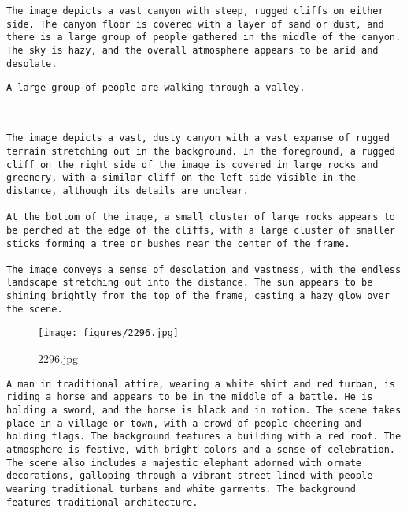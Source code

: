 \begin{lstlisting}[caption={Captions using Phi 4 for 998.jpg}]
The image depicts a vast canyon with steep, rugged cliffs on either side. The canyon floor is covered with a layer of sand or dust, and there is a large group of people gathered in the middle of the canyon. The sky is hazy, and the overall atmosphere appears to be arid and desolate.
\end{lstlisting}


\begin{lstlisting}[caption={Captions using Phi 4 with SAM 2 for 998.jpg}]
A large group of people are walking through a valley.
\end{lstlisting}


\begin{lstlisting}[caption={Captions using Llama 3.2 with SAM 2 for 998.jpg}]


The image depicts a vast, dusty canyon with a vast expanse of rugged terrain stretching out in the background. In the foreground, a rugged cliff on the right side of the image is covered in large rocks and greenery, with a similar cliff on the left side visible in the distance, although its details are unclear.

At the bottom of the image, a small cluster of large rocks appears to be perched at the edge of the cliffs, with a large cluster of smaller sticks forming a tree or bushes near the center of the frame.

The image conveys a sense of desolation and vastness, with the endless landscape stretching out into the distance. The sun appears to be shining brightly from the top of the frame, casting a hazy glow over the scene.
\end{lstlisting}

\clearpage
\begin{figure}[H]
    \centering
    \texttt{[image: figures/2296.jpg]}
    \caption{2296.jpg}
    \label{fig:2296.jpg}
\end{figure}



\begin{lstlisting}[caption={Captions using Ensemble without Llama for 2296.jpg}]
A man in traditional attire, wearing a white shirt and red turban, is riding a horse and appears to be in the middle of a battle. He is holding a sword, and the horse is black and in motion. The scene takes place in a village or town, with a crowd of people cheering and holding flags. The background features a building with a red roof. The atmosphere is festive, with bright colors and a sense of celebration. The scene also includes a majestic elephant adorned with ornate decorations, galloping through a vibrant street lined with people wearing traditional turbans and white garments. The background features traditional architecture.
\end{lstlisting}


